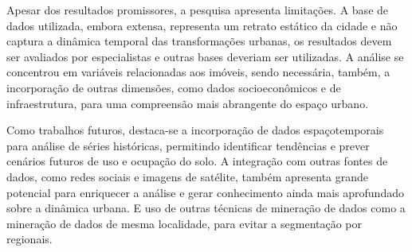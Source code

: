 \documentclass[12pt]{article}
\begin{document}
Apesar dos resultados promissores, a pesquisa apresenta limitações. A base de dados utilizada, embora extensa, representa um retrato estático da cidade e não captura a dinâmica temporal das transformações urbanas, os resultados devem ser avaliados por especialistas e outras bases deveriam ser utilizadas. A análise se concentrou em variáveis relacionadas aos imóveis, sendo necessária, também, a incorporação de outras dimensões, como dados socioeconômicos e de infraestrutura, para uma compreensão mais abrangente do espaço urbano.

Como trabalhos futuros, destaca-se a incorporação de dados espaçotemporais para análise de séries históricas, permitindo identificar tendências e prever cenários futuros de uso e ocupação do solo. A integração com outras fontes de dados, como redes sociais e imagens de satélite, também apresenta grande potencial para enriquecer a análise e gerar conhecimento ainda mais aprofundado sobre a dinâmica urbana. E uso de outras técnicas de mineração de dados como a mineração de dados de mesma localidade, para evitar a segmentação por regionais.


\end{document}
